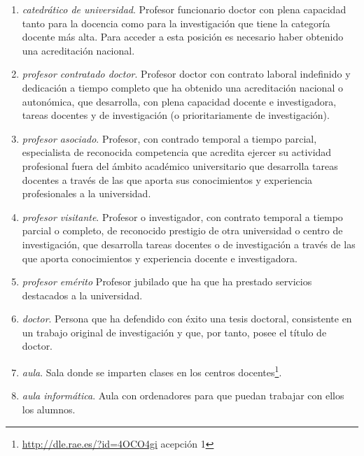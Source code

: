 \begin{enumerate}
    \item \emph{catedrático de universidad}. Profesor funcionario doctor con plena
        capacidad tanto para la docencia como para la investigación que tiene
        la categoría docente más alta. Para acceder a esta posición es
        necesario haber obtenido una acreditación nacional\cite{leyUniversidades}.

    \item \emph{profesor contratado doctor}. Profesor doctor con contrato
        laboral indefinido y dedicación a tiempo completo que ha obtenido una
        acreditación nacional o autonómica, que desarrolla, con plena capacidad
        docente e investigadora, tareas docentes y de investigación (o
        prioritariamente de investigación)\cite[artículo 52]{leyUniversidades}.

    \item \emph{profesor asociado}. Profesor, con contrado temporal a tiempo
        parcial, especialista de reconocida competencia que acredita ejercer su
        actividad profesional fuera del ámbito académico universitario que
        desarrolla tareas docentes a través de las que aporta sus conocimientos
        y experiencia profesionales a la universidad\cite[artículo 53]{leyUniversidades}.

    \item \emph{profesor visitante}. Profesor o investigador, con contrato
        temporal a tiempo parcial o completo, de reconocido prestigio de otra
        universidad o centro de investigación, que desarrolla tareas docentes o
        de investigación a través de las que aporta conocimientos y experiencia
        docente e investigadora\cite[artículo 54]{leyUniversidades}.

    \item \emph{profesor emérito} Profesor jubilado que ha que ha prestado
        servicios destacados a la universidad\cite[artículo 54bis]{leyUniversidades}.

    \item \emph{doctor}. Persona que ha defendido con éxito una tesis doctoral,
        consistente en un trabajo original de investigación y que, por tanto,
        posee el título de doctor.

    \item \emph{aula}. Sala donde se imparten clases en los centros
        docentes\footnote{\url{http://dle.rae.es/?id=4OCO4gi} acepción 1}.

    \item \emph{aula informática}. Aula con ordenadores para que puedan
        trabajar con ellos los alumnos.


\end{enumerate}
